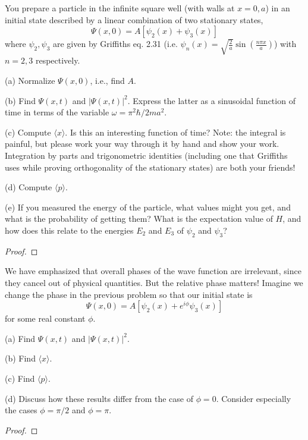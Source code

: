 \documentclass{article}
\begin{document}
\begin{ques}\label{q4}
You prepare a particle in the infinite square well (with walls at $x = 0, a$) in an initial state
described by a linear combination of two stationary states,
\[
\Psi(x, 0) = A[\psi_2(x) + \psi_3(x)]
\]
where $\psi_2, \psi_3$ are given by Griffiths eq. 2.31 (i.e. $\psi_n(x) = \sqrt{\frac{2}{a}}\sin\left(\frac{n\pi x}{a}\right)$) with $n = 2, 3$
respectively.

(a) Normalize $\Psi(x, 0)$, i.e., find $A$.

(b) Find $\Psi(x, t)$ and $|\Psi(x, t)|^2$. Express the latter as a sinusoidal function of time in
terms of the variable $\omega = \pi^2\hbar / 2ma^2$.

(c) Compute $\langle x \rangle$. Is this an interesting function of time? Note: the integral is painful,
but please work your way through it by hand and show your work. Integration by
parts and trigonometric identities (including one that Griffiths uses while proving
orthogonality of the stationary states) are both your friends!

(d) Compute $\langle p \rangle$.

(e) If you measured the energy of the particle, what values might you get, and what is
the probability of getting them? What is the expectation value of $H$, and how does
this relate to the energies $E_2$ and $E_3$ of $\psi_2$ and $\psi_3$?
\end{ques}

\begin{proof}
\end{proof}

\newpage

\begin{ques}\label{q5}
We have emphasized that overall phases of the wave function are irrelevant, since they
cancel out of physical quantities. But the relative phase matters! Imagine we change the
phase in the previous problem so that our initial state is
\[
\Psi(x, 0) = A[\psi_2(x) + e^{i\phi}\psi_3(x)]
\]
for some real constant $\phi$.

(a) Find $\Psi(x, t)$ and $|\Psi(x, t)|^2$.

(b) Find $\langle x \rangle$.

(c) Find $\langle p \rangle$.

(d) Discuss how these results differ from the case of $\phi = 0$. Consider especially the cases
$\phi = \pi/2$ and $\phi = \pi$.
\end{ques}

\begin{proof}
\end{proof}
\end{document}
